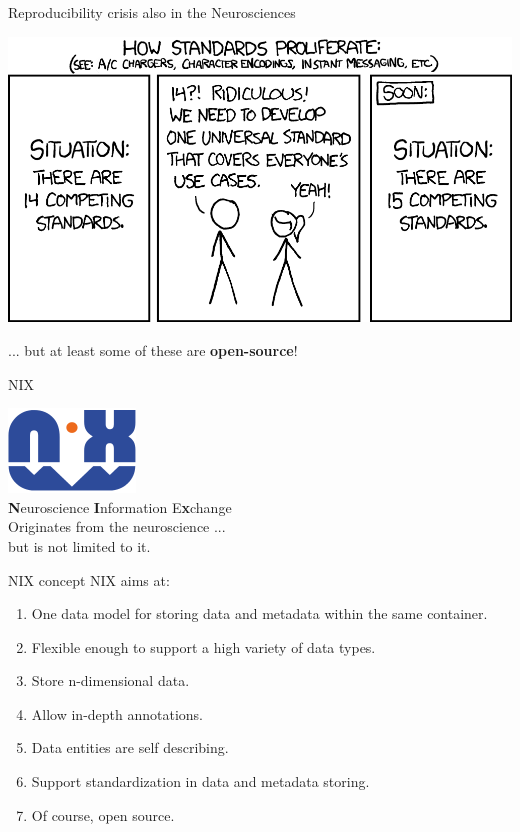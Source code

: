 \documentclass[pdftex]{beamer}
\begin{document}
\begin{frame}{Reproducibility crisis also in the Neurosciences}
    \begin{center}
        \includegraphics[width=0.75\columnwidth]{resources/standards}
    \end{center}
    \pause
    ... but at least some of these are \textbf{open-source}!
\end{frame}


\begin{frame}{NIX}
    \begin{center}
        \includegraphics[width=0.35\columnwidth]{resources/nix_logo}\\
        \vspace{2ex}
        \textbf{N}euroscience \textbf{I}nformation E\textbf{x}change\\
        \vspace{2ex}
        Originates from the neuroscience ...\\but is not limited to it.
    \end{center}
\end{frame}


\begin{frame}{NIX concept}
    NIX aims at:
    \begin{enumerate}
        \item One data model for storing data and metadata within the same container.
        \item Flexible enough to support a high variety of data types.
        \item Store n-dimensional data.
        \item Allow in-depth annotations.
        \item Data entities are self describing.
        \item Support standardization in data and metadata storing.\vspace{2ex}
        \item Of course, open source.
    \end{enumerate}
\end{frame}
\end{document}
